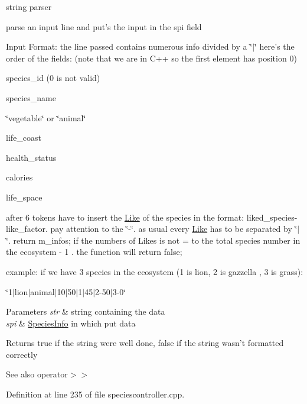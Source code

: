 string parser 

parse an input line and put's the input in the spi field

Input Format: the line passed contains numerous info divided by a \char`\"{}$|$\char`\"{} here's the order of the fields: (note that we are in C++ so the first element has position 0)


\begin{DoxyItemize}
\item species\_\-id (0 is not valid)
\item species\_\-name
\item \char`\"{}vegetable\char`\"{} or \char`\"{}animal\char`\"{}
\item life\_\-coast
\item health\_\-status
\item calories
\item life\_\-space
\end{DoxyItemize}

after 6 tokens have to insert the \hyperlink{structLike}{Like} of the species in the format: liked\_\-species-\/like\_\-factor. pay attention to the \char`\"{}-\/\char`\"{}. as usual every \hyperlink{structLike}{Like} has to be separated by \char`\"{}$|$\char`\"{}. return m\_\-infos; if the numbers of Likes is not = to the total species number in the ecosystem -\/ 1 . the function will return false;

example: if we have 3 species in the ecosystem (1 is lion, 2 is gazzella , 3 is grass):

\char`\"{}1$|$lion$|$animal$|$10$|$50$|$1$|$45$|$2-\/50$|$3-\/0\char`\"{}


\begin{DoxyParams}{Parameters}
{\em str} & string containing the data \\
\hline
{\em spi} & \hyperlink{structSpeciesInfo}{SpeciesInfo} in which put data \\
\hline
\end{DoxyParams}
\begin{DoxyReturn}{Returns}
true if the string were well done, false if the string wasn't formatted correctly 
\end{DoxyReturn}
\begin{DoxySeeAlso}{See also}
operator$>$$>$ 
\end{DoxySeeAlso}


Definition at line 235 of file speciescontroller.cpp.



